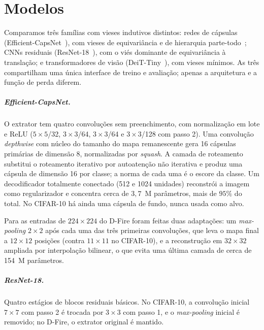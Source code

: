 \chapter{Modelos}
\label{cap3}

Comparamos três famílias com vieses indutivos distintos: redes de cápsulas
(Efficient-CapsNet~\cite{mazzia2021efficient}), com vieses de equivariância e
de hierarquia parte-todo~\cite{sabour2017dynamic}; CNNs residuais
(ResNet-18~\cite{he2016resnet}), com o viés dominante de equivariância à
translação; e transformadores de visão
(DeiT-Tiny~\cite{dosovitskiy2021vit,touvron2021deit}), com vieses mínimos. As
três compartilham uma única interface de treino e avaliação; apenas a
arquitetura e a função de perda diferem.

\paragraph{Efficient-CapsNet.}
O extrator tem quatro convoluções sem preenchimento, com normalização em lote e
ReLU ($5\times5$/32, $3\times3$/64, $3\times3$/64 e $3\times3$/128 com passo 2).
Uma convolução \emph{depthwise} com núcleo do tamanho do mapa remanescente gera
16 cápsulas primárias de dimensão 8, normalizadas por \emph{squash}. A camada de
roteamento substitui o roteamento iterativo por autoatenção não iterativa e
produz uma cápsula de dimensão 16 por classe; a norma de cada uma é o escore da
classe. Um decodificador totalmente conectado (512 e 1024 unidades) reconstrói a
imagem como regularizador e concentra cerca de $3{,}7$~M parâmetros, mais de
$95\%$ do total. No CIFAR-10 há ainda uma cápsula de fundo, nunca usada como
alvo.

Para as entradas de $224\times224$ do D-Fire foram feitas duas adaptações: um
\emph{max-pooling} $2\times2$ após cada uma das três primeiras convoluções, que
leva o mapa final a $12\times12$ posições (contra $11\times11$ no CIFAR-10), e a
reconstrução em $32\times32$ ampliada por interpolação bilinear, o que evita uma
última camada de cerca de 154~M parâmetros.

\paragraph{ResNet-18.}
Quatro estágios de blocos residuais básicos. No CIFAR-10, a convolução inicial
$7\times7$ com passo 2 é trocada por $3\times3$ com passo 1, e o
\emph{max-pooling} inicial é removido; no D-Fire, o extrator original é mantido.


